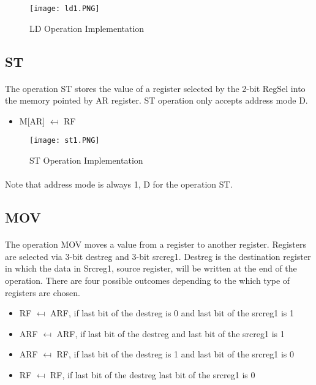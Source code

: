 \documentclass{article}
\begin{document}
\begin{figure}[h]
    \centering
    \texttt{[image: ld1.PNG]}
    \caption{LD Operation Implementation}
    \label{fig:my_label}
\end{figure}


\subsection{ST}
\paragraph{}
The operation ST stores the value of a register selected by the 2-bit RegSel into the memory pointed by AR register. ST operation only accepts address mode D. 

\begin{itemize}
    \item M[AR] $\mapsfrom$ RF
\end{itemize}

\begin{figure}[h]
    \centering
    \texttt{[image: st1.PNG]}
    \caption{ST Operation Implementation}
    \label{fig:my_label}
\end{figure}


\paragraph{}  
Note that address mode is always 1, D for the operation ST.

\subsection{MOV}
\paragraph{}
The operation MOV moves a value from a register to another register. Registers are selected via 3-bit destreg and 3-bit srcreg1. Destreg is the destination register in which the data in Srcreg1, source register, will be written at the end of the operation. There are four possible outcomes depending to the which type of registers are chosen.
\begin{itemize}
    \item RF $\mapsfrom$ ARF, if last bit of the destreg is 0 and last bit of the srcreg1 is 1
    \item ARF $\mapsfrom$ ARF, if last bit of the destreg and last bit of the srcreg1 is 1
    \item ARF $\mapsfrom$ RF, if last bit of the destreg is 1 and last bit of the srcreg1 is 0
    \item RF $\mapsfrom$ RF, if last bit of the destreg last bit of the srcreg1 is 0
\end{itemize}
\end{document}
